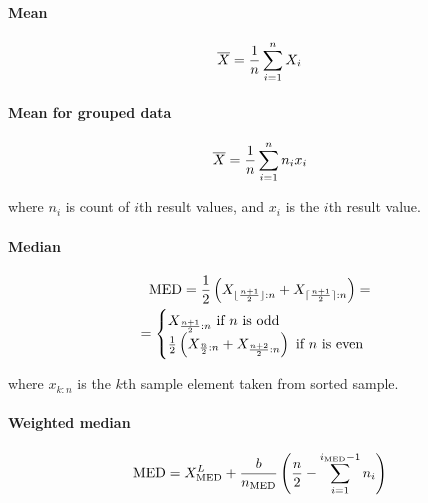 \paragraph{Mean} \hspace{0pt}

\vspace{-20pt}
\begin{gather*}
\overline{X} = \frac{1}{n}\sum_{i=1}^n X_i
\end{gather*}

\paragraph{Mean for grouped data} \hspace{0pt}

\vspace{-5pt}
\begin{gather*}
\overline{X} = \frac{1}{n}\sum_{i=1}^n n_i x_i
\end{gather*}

where $n_i$ is count of $i$th result values, and $x_i$ is the $i$th result value.


\paragraph{Median} \hspace{0pt}

\vspace{-20pt}
\begin{gather*}
\textrm{MED} = \frac{1}{2} \left( X_{\lfloor \frac{n+1}{2} \rfloor : n} + X_{\lceil \frac{n+1}{2} \rceil : n} \right) =\\ 
= \begin{cases}
 X_{\frac{n+1}{2} : n} \mbox{ if } n \mbox{ is odd} \\
 \frac{1}{2} \left( X_{\frac{n}{2} : n} + X_{\frac{n+2}{2} : n} \right) \mbox{ if } n \mbox{ is even}
\end{cases}
\end{gather*}

where $x_{k:n}$ is the $k$th sample element taken from sorted sample.

\paragraph{Weighted median}
\begin{gather*}
\textrm{MED} = X_{\textrm{MED}}^L + \frac{b}{n_{\textrm{MED}}} \left( \frac{n}{2} - \sum_{i=1}^{i_{\textrm{MED}}-1} n_i \right)
\end{gather*}

